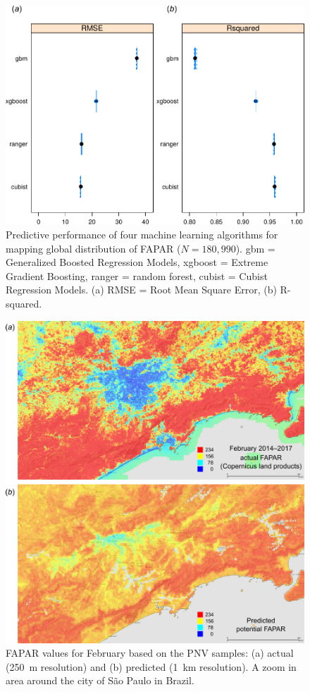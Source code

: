 \documentclass[fleqn,10pt,lineno]{wlpeerj} %
\begin{document}
\begin{figure}[!hbt]
\centering
\includegraphics[width=.7\linewidth]{Fig_11.pdf}
\caption{Predictive performance of four machine learning algorithms for mapping global distribution of FAPAR ($N=180,990$). \textsf{gbm} = Generalized Boosted Regression Models, \textsf{xgboost} = Extreme Gradient Boosting, \textsf{ranger} = random forest,  \textsf{cubist} = Cubist Regression Models. (a) RMSE = Root Mean Square Error, (b) R-squared.}
\label{Fig_boxplot_FAPAR_accuracy}
\end{figure}

\begin{figure}[!hp]
\centering
\includegraphics[width=\linewidth]{Fig_12.png}
\caption{FAPAR values for February based on the PNV samples: (a) actual (\SI{250}{\metre} resolution) and (b) predicted (\SI{1}{\kilo\metre} resolution). A zoom in area around the city of S\~{a}o Paulo in Brazil.}
\label{Fig_FAPAR_predicted_Sao_Paolo}
\end{figure}
\end{document}
